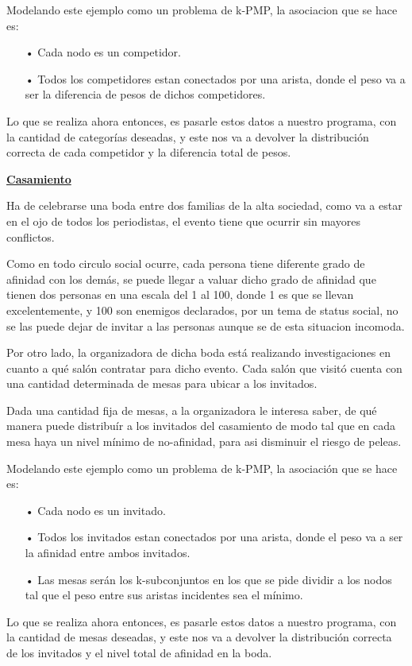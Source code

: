 \documentclass[10pt,a4paper]{article}
\begin{document}
Modelando este ejemplo como un problema de k-PMP, la asociacion que se hace es:

\begin{itemize}
\item[•]Cada nodo es un competidor.
\item[•]Todos los competidores estan conectados por una arista, donde el peso va a ser la diferencia de pesos de dichos competidores.
\end{itemize}

Lo que se realiza ahora entonces, es pasarle estos datos a nuestro programa, con la cantidad de categorías deseadas, y este nos va a devolver la distribución correcta de cada competidor y la diferencia total de pesos.

\bigskip
\noindent \underline{\textbf{Casamiento}}

Ha de celebrarse una boda entre dos familias de la alta sociedad, como va a estar en el ojo de todos los periodistas, el evento tiene que ocurrir sin mayores conflictos.  

Como en todo circulo social ocurre, cada persona tiene diferente grado de afinidad con los demás, se puede llegar a valuar dicho grado de afinidad que tienen dos personas en una escala del 1 al 100, donde 1 es que se llevan excelentemente, y 100 son enemigos declarados, por un tema de status social, no se las puede dejar de invitar a las personas aunque se de esta situacion incomoda.

Por otro lado, la organizadora de dicha boda está realizando investigaciones en cuanto a qué salón contratar para dicho evento. Cada salón que visitó cuenta con una cantidad determinada de mesas para ubicar a los invitados.

Dada una cantidad fija de mesas, a la organizadora le interesa saber, de qué manera puede distribuír a los invitados del casamiento de modo tal que en cada mesa haya un nivel mínimo de no-afinidad, para asi disminuir el riesgo de peleas.

Modelando este ejemplo como un problema de k-PMP, la asociación que se hace es:
\begin{itemize}
\item[•]Cada nodo es un invitado.
\item[•]Todos los invitados estan conectados por una arista, donde el peso va a ser la afinidad entre ambos invitados.
\item[•]Las mesas serán los k-subconjuntos en los que se pide dividir a los nodos tal que el peso entre sus aristas incidentes sea el mínimo.
\end{itemize}

Lo que se realiza ahora entonces, es pasarle estos datos a nuestro programa, con la cantidad de mesas deseadas, y este nos va a devolver la distribución correcta de los invitados y el nivel total de afinidad en la boda.
\end{document}
